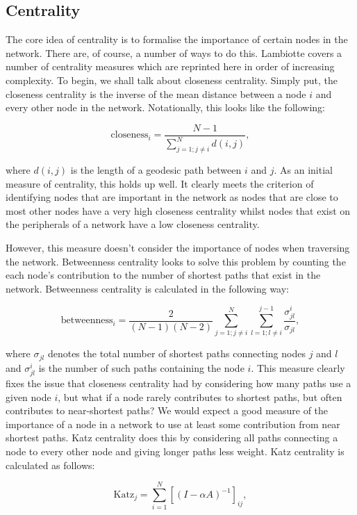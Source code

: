 \subsection{Centrality}
The core idea of centrality is to formalise the importance of certain nodes in the network. There are, of course, a number of ways to do this. Lambiotte covers a number of centrality measures \cite[p. 18]{oxford:renaud_notes} which are reprinted here in order of increasing complexity. To begin, we shall talk about closeness centrality. Simply put, the closeness centrality is the inverse of the mean distance between a node $i$ and every other node in the network. Notationally, this looks like the following:

$$ \text{closeness}_i = \frac{N - 1}{\sum_{j=1; j\not=i}^N d(i, j)}, $$

\noindent
where $d(i, j)$ is the length of a geodesic path between $i$ and $j$. As an initial measure of centrality, this holds up well. It clearly meets the criterion of identifying nodes that are important in the network as nodes that are close to most other nodes have a very high closeness centrality whilst nodes that exist on the peripherals of a network have a low closeness centrality.

However, this measure doesn't consider the importance of nodes when traversing the network. Betweenness centrality looks to solve this problem by counting the each node's contribution to the number of shortest paths that exist in the network. Betweenness centrality is calculated in the following way:

$$ \text{betweenness}_i = \frac{2}{(N-1)(N-2)}\sum_{j=1; j\not=i}^N \sum_{l=1; l\not=i}^{j-1} \frac{\sigma_{jl}^i}{\sigma_{jl}}, $$

\noindent
where $\sigma_{jl}$ denotes the total number of shortest paths connecting nodes $j$ and $l$ and $\sigma^i_{jl}$ is the number of such paths containing the node $i$. This measure clearly fixes the issue that closeness centrality had by considering how many paths use a given node $i$, but what if a node rarely contributes to shortest paths, but often contributes to near-shortest paths? We would expect a good measure of the importance of a node in a network to use at least some contribution from near shortest paths. Katz centrality does this by considering all paths connecting a node to every other node and giving longer paths less weight. Katz centrality is calculated as follows:

$$ \text{Katz}_j = \sum_{i=1}^N[(I - \alpha A)^{-1}]_{ij}, $$

